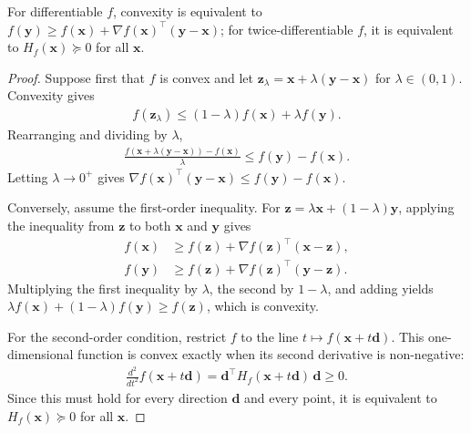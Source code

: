 \documentclass[a4paper, 12pt]{book}
\begin{document}
\begin{proposition}
    For differentiable $f$, convexity is equivalent to $f(\mathbf{y}) \geq f(\mathbf{x}) + \nabla f(\mathbf{x})^\top(\mathbf{y}-\mathbf{x})$; for twice-differentiable $f$, it is equivalent to $H_f(\mathbf{x}) \succeq 0$ for all $\mathbf{x}$.
\end{proposition}
\begin{proof}
    Suppose first that $f$ is convex and let
    $\mathbf{z}_\lambda=\mathbf{x}+\lambda(\mathbf{y}-\mathbf{x})$ for
    $\lambda\in(0,1)$. Convexity gives
    \begin{align}
        f(\mathbf{z}_\lambda)
        \leq (1-\lambda)f(\mathbf{x})+\lambda f(\mathbf{y}).
    \end{align}
    Rearranging and dividing by $\lambda$,
    \begin{align}
        \frac{f(\mathbf{x}+\lambda(\mathbf{y}-\mathbf{x}))-f(\mathbf{x})}{\lambda}
        \leq f(\mathbf{y})-f(\mathbf{x}).
    \end{align}
    Letting $\lambda\to0^+$ gives
    $\nabla f(\mathbf{x})^\top(\mathbf{y}-\mathbf{x})\leq f(\mathbf{y})-f(\mathbf{x})$.

    Conversely, assume the first-order inequality. For
    $\mathbf{z}=\lambda\mathbf{x}+(1-\lambda)\mathbf{y}$, applying the inequality
    from $\mathbf{z}$ to both $\mathbf{x}$ and $\mathbf{y}$ gives
    \begin{align}
        f(\mathbf{x}) &\geq f(\mathbf{z})+\nabla f(\mathbf{z})^\top(\mathbf{x}-\mathbf{z}),\\
        f(\mathbf{y}) &\geq f(\mathbf{z})+\nabla f(\mathbf{z})^\top(\mathbf{y}-\mathbf{z}).
    \end{align}
    Multiplying the first inequality by $\lambda$, the second by $1-\lambda$, and
    adding yields
    $\lambda f(\mathbf{x})+(1-\lambda)f(\mathbf{y})\geq f(\mathbf{z})$, which is
    convexity.

    For the second-order condition, restrict $f$ to the line
    $t\mapsto f(\mathbf{x}+t\mathbf{d})$. This one-dimensional function is convex
    exactly when its second derivative is non-negative:
    \begin{align}
        \frac{d^2}{dt^2}f(\mathbf{x}+t\mathbf{d})
        = \mathbf{d}^\top H_f(\mathbf{x}+t\mathbf{d})\,\mathbf{d}\geq0.
    \end{align}
    Since this must hold for every direction $\mathbf{d}$ and every point, it is
    equivalent to $H_f(\mathbf{x})\succeq0$ for all $\mathbf{x}$.
\end{proof}
\end{document}
